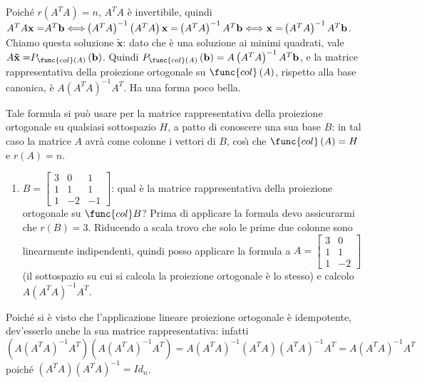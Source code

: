 \documentclass{article}
\begin{document}
Poich\'{e} $r\left( A^{T}A\right) =n$, $A^{T}A$ \`{e} invertibile, quindi $%
A^{T}A\mathbf{x=}A^{T}\mathbf{b\Longleftrightarrow }\left( A^{T}A\right)
^{-1}\left( A^{T}A\right) \mathbf{x=}\left( A^{T}A\right) ^{-1}A^{T}\mathbf{%
b\Longleftrightarrow x=}\left( A^{T}A\right) ^{-1}A^{T}\mathbf{b}$. Chiamo
questa soluzione $\mathbf{\tilde{x}}$: dato che \`{e} una soluzione ai
minimi quadrati, vale $A\mathbf{\tilde{x}=}P_{\func{col}\left( A\right)
}\left( \mathbf{b}\right) $. Quindi $P_{\func{col}\left( A\right) }\left( 
\mathbf{b}\right) =A\left( A^{T}A\right) ^{-1}A^{T}\mathbf{b}$, e la matrice
rappresentativa della proiezione ortogonale su $\func{col}\left( A\right) $,
rispetto alla base canonica, \`{e} $A\left( A^{T}A\right) ^{-1}A^{T}$. Ha
una forma poco bella.

Tale formula si pu\`{o} usare per la matrice rappresentativa della
proiezione ortogonale su qualsiasi sottospazio $H$, a patto di conoscere una
sua base $B$: in tal caso la matrice $A$ avr\`{a} come colonne i vettori di $%
B$, cos\`{\i} che $\func{col}\left( A\right) =H$ e $r\left( A\right) =n$.

\begin{enumerate}
\item $B=\left[ 
\begin{array}{ccc}
3 & 0 & 1 \\ 
1 & 1 & 1 \\ 
1 & -2 & -1%
\end{array}%
\right] $: qual \`{e} la matrice rappresentativa della proiezione ortogonale
su $\func{col}B$? Prima di applicare la formula devo assicurarmi che $%
r\left( B\right) =3$. Riducendo a scala trovo che solo le prime due colonne
sono linearmente indipendenti, quindi posso applicare la formula a $A=\left[ 
\begin{array}{cc}
3 & 0 \\ 
1 & 1 \\ 
1 & -2%
\end{array}%
\right] $ (il sottospazio su cui si calcola la proiezione ortogonale \`{e}
lo stesso) e calcolo $A\left( A^{T}A\right) ^{-1}A^{T}$.
\end{enumerate}

Poich\'{e} si \`{e} visto che l'applicazione lineare proiezione ortogonale 
\`{e} idempotente, dev'esserlo anche la sua matrice rappresentativa: infatti 
$\left( A\left( A^{T}A\right) ^{-1}A^{T}\right) \left( A\left( A^{T}A\right)
^{-1}A^{T}\right) =A\left( A^{T}A\right) ^{-1}\left( A^{T}A\right) \left(
A^{T}A\right) ^{-1}A^{T}=A\left( A^{T}A\right) ^{-1}A^{T}$ poich\'{e} $%
\left( A^{T}A\right) \left( A^{T}A\right) ^{-1}=Id_{n}$.
\end{document}
